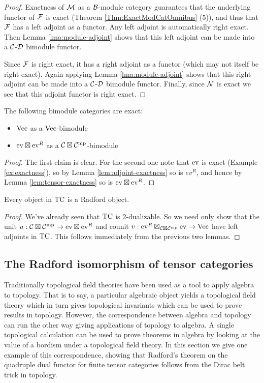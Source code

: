 \documentclass{amsart}
\begin{document}
\begin{proof}
Exactness of $\cM$ as a $\cB$-module category guarantees that the underlying functor of $\cF$ is exact (Theorem \ref{Thm:ExactModCatOmnibus} (5)), and thus that $\cF$ has a left adjoint as a functor.  Any left adjoint is automatically right exact.  Then Lemma \ref{lma:module-adjoint} shows that this left adjoint can be made into a $\cC$-$\cD$ bimodule functor.   

Since $\cF$ is right exact, it has a right adjoint as a functor (which may not itself be right exact).  Again applying Lemma \ref{lma:module-adjoint} shows that this right adjoint can be made into a $\cC$-$\cD$ bimodule functor.   Finally, since $\cN$ is exact we see that this adjoint functor is right exact.
\end{proof}

\begin{lemma}
The following bimodule categories are exact:
\begin{itemize}
\item $\Vec$ as a $\Vec$-bimodule
\item $\ev \boxtimes \ev^R$ as a $\cC \boxtimes \cC^\mp$-bimodule
\end{itemize}
\end{lemma}
\begin{proof}
The first claim is clear.  For the second one note that $\ev$ is exact (Example \ref{ex:exactness}), so by Lemma \ref{lem:adjoint-exactness} so is $ev^R$, and hence by Lemma \ref{lem:tensor-exactness} so is $\ev \boxtimes \ev^R$.
\end{proof}

\begin{theorem}
Every object in $\TC$ is a Radford object.
\end{theorem}
\begin{proof}
We've already seen that $\TC$ is $2$-dualizable.  So we need only show that the unit $u: \cC \boxtimes \cC^\mp \rightarrow \ev \boxtimes \ev^R$ and counit $v: \ev^R \boxtimes_{\cC \boxtimes \cC^\mp} \ev \rightarrow \Vec$ have left adjoints in $\TC$.  This follows immediately from the previous two lemmas.
\end{proof}

\subsection{The Radford isomorphism of tensor categories}

Traditionally topological field theories have been used as a tool to apply algebra to topology.  That is to say, a particular algebraic object yields a topological field theory which in turn gives topological invariants which can be used to prove results in topology.  However, the correspondence between algebra and topology can run the other way giving applications of topology to algebra.  A single topological calculation can be used to prove theorems in algebra by looking at the value of a bordism under a topological field theory.  In this section we give one example of this correspondence, showing that Radford's theorem on the quadruple dual functor for finite tensor categories follows from the Dirac belt trick in topology.
\end{document}
